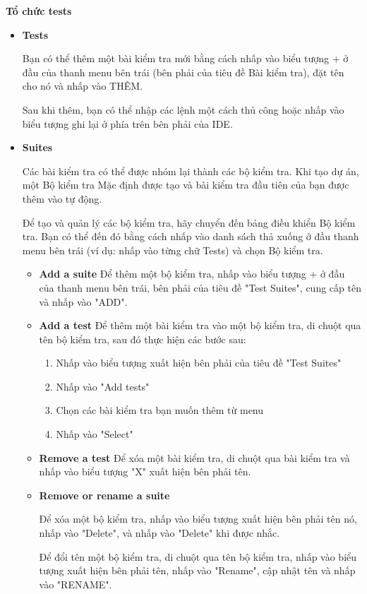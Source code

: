 \textbf{Tổ chức tests}
\begin{itemize}
    \item \textbf{Tests}
    
    Bạn có thể thêm một bài kiểm tra mới bằng cách nhấp vào biểu tượng + ở đầu của thanh menu bên trái (bên phải của tiêu đề Bài kiểm tra), đặt tên cho nó và nhấp vào THÊM.
    
    Sau khi thêm, bạn có thể nhập các lệnh một cách thủ công hoặc nhấp vào biểu tượng ghi lại ở phía trên bên phải của IDE.

    \item \textbf{Suites}
    
    Các bài kiểm tra có thể được nhóm lại thành các bộ kiểm tra.
    Khi tạo dự án, một Bộ kiểm tra Mặc định được tạo và bài kiểm tra đầu tiên của bạn được thêm vào tự động.
    
    Để tạo và quản lý các bộ kiểm tra, hãy chuyển đến bảng điều khiển Bộ kiểm tra. Bạn có thể đến đó bằng cách nhấp vào danh sách thả xuống ở đầu thanh menu bên trái (ví dụ: nhấp vào từng chữ Tests) và chọn Bộ kiểm tra.

    \begin{itemize}
        \item \textbf{Add a suite}
        Để thêm một bộ kiểm tra, nhấp vào biểu tượng + ở đầu của thanh menu bên trái, bên phải của tiêu đề "Test Suites", cung cấp tên và nhấp vào "ADD".

        \item \textbf{Add a test}
        Để thêm một bài kiểm tra vào một bộ kiểm tra, di chuột qua tên bộ kiểm tra, sau đó thực hiện các bước sau:
        \begin{enumerate}
            \item Nhấp vào biểu tượng xuất hiện bên phải của tiêu đề "Test Suites"
            \item Nhấp vào "Add tests"
            \item Chọn các bài kiểm tra bạn muốn thêm từ menu
            \item Nhấp vào "Select"
        \end{enumerate}

        \item \textbf{Remove a test}
        Để xóa một bài kiểm tra, di chuột qua bài kiểm tra và nhấp vào biểu tượng "X" xuất hiện bên phải tên.

        
        \item \textbf{Remove or rename a suite}
        
        Để xóa một bộ kiểm tra, nhấp vào biểu tượng xuất hiện bên phải tên nó, nhấp vào "Delete", và nhấp vào "Delete" khi được nhắc.
        
        Để đổi tên một bộ kiểm tra, di chuột qua tên bộ kiểm tra, nhấp vào biểu tượng xuất hiện bên phải tên, nhấp vào "Rename", cập nhật tên và nhấp vào "RENAME".
        
    \end{itemize}
    
\end{itemize}

